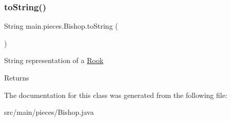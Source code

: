 \subsubsection{\texorpdfstring{to\+String()}{toString()}}
{\footnotesize\ttfamily String main.\+pieces.\+Bishop.\+to\+String (\begin{DoxyParamCaption}{ }\end{DoxyParamCaption})}

String representation of a \hyperlink{classmain_1_1pieces_1_1_rook}{Rook} \begin{DoxyReturn}{Returns}

\end{DoxyReturn}


The documentation for this class was generated from the following file\+:\begin{DoxyCompactItemize}
\item 
src/main/pieces/Bishop.\+java\end{DoxyCompactItemize}
